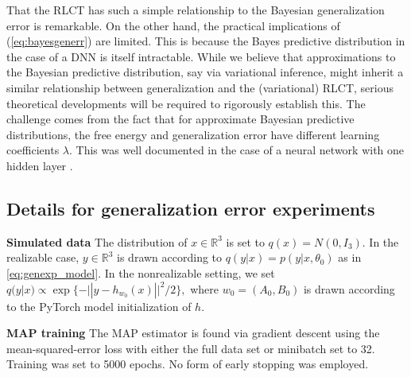 \documentclass{article} %
\begin{document}
That the RLCT has such a simple relationship to the Bayesian generalization error is remarkable. On the other hand, the practical implications of (\ref{eq:bayesgenerr}) are limited. This is because the Bayes predictive distribution in the case of a DNN is itself intractable. While we believe that approximations to the Bayesian predictive distribution, say via variational inference, might inherit a similar relationship between generalization and the (variational) RLCT, serious theoretical developments will be required to rigorously establish this. The challenge comes from the fact that for approximate Bayesian predictive distributions, the free energy and generalization error have different learning coefficients $\lambda$. This was well documented in the case of a neural network with one hidden layer \citep{nakajima_variational_2007}. 

\subsection{Details for generalization error experiments}
\label{appendix:generalizaton}

\textbf{Simulated data}
The distribution of $x \in \mathbb R^3$ is set to $q(x)=N(0,I_3)$. 
In the realizable case, $y \in \mathbb R^3$ is drawn according to $q(y|x) = p(y|x,\theta_0)$ as in \eqref{eq:genexp_model}. In the nonrealizable setting, we set $q(y|x) \propto \exp\{-|| y - h_{w_0}(x) ||^2/2\},$ where $w_0 = (A_0,B_0)$ is drawn according to the PyTorch model initialization of $h$.


\textbf{MAP training}
The MAP estimator is found via gradient descent using the mean-squared-error loss with either the full data set or minibatch set to 32. Training was set to 5000 epochs. No form of early stopping was employed.
\end{document}
